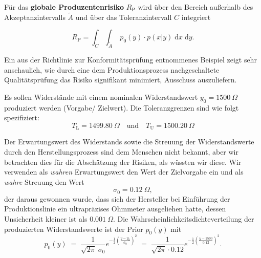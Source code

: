 Für das \textbf{globale Produzentenrisiko} $R_\mathrm{P}$ wird über den Bereich außerhalb des Akzeptanzintervalls $\tilde A$ und über das Toleranzintervall $C$ integriert

\begin{equation}
	R_\mathrm{P} =  \int_{C} \int_{\tilde A} \; p_0(y) \cdot p(x|y) \; \mathrm{d}x\; \mathrm{d}y.
		\label{eq:globalesProduzentenrisiko}
\end{equation}

Ein aus der Richtlinie zur Konformitätsprüfung \cite{JCGM106} entnommenes Beispiel
zeigt sehr anschaulich, wie durch eine dem Produktionsprozess nachgeschaltete
Qualitätsprüfung das Risiko signifikant minimiert, Ausschuss auszuliefern.

Es sollen Widerstände mit einem nominalen Widerstandswert $y_0 = 1500~\Omega$ produziert werden (Vorgabe/ Zielwert). Die Toleranzgrenzen sind wie folgt spezifiziert:
\[
T_\mathrm{L} = 1499.80~\Omega \quad \textrm{und} \quad T_\mathrm{U} = 1500.20~\Omega
\]

Der Erwartungswert des Widerstands sowie die Streuung der Widerstandswerte
durch den Herstellungsprozess sind dem  Menschen nicht bekannt,
aber wir betrachten dies für die Abschätzung der
Risiken, als wüssten wir diese. Wir verwenden als \textsl{wahren} Erwartungswert
den Wert der Zielvorgabe ein und als \textsl{wahre}
Streuung den Wert
\[
\sigma_0 = 0.12~\Omega ,
\]
der daraus gewonnen wurde, dass sich der Hersteller bei Einführung der Produktionslinie
ein ultrapräzises Ohmmeter ausgeliehen hatte, dessen Unsicherheit kleiner ist als
$0.001~\Omega$.
Die Wahrscheinlichkeitsdichteverteilung der produzierten Widerstandswerte
ist der Prior $p_0(y)$ mit
\begin{equation}
p_0(y) \; = \; \frac{1}{\sqrt{2 \pi} \; \sigma_0}
	e^{-\frac{1}{2}\left(\frac{y - y_0}{\sigma_0}\right)^2} \; = \;
 \frac{1}{\sqrt{2 \pi} \cdot 0.12}
	e^{-\frac{1}{2}\left(\frac{y - 1500}{0.12}\right)^2}.
\end{equation}


